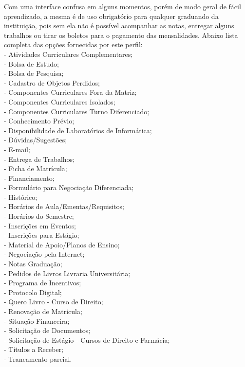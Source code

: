 Com uma interface confusa em alguns momentos, porém de modo geral de fácil aprendizado, 
a mesma é de uso obrigatório para qualquer graduando da instituição, pois sem ela não é possível 
acompanhar as notas, entregar alguns trabalhos ou tirar os boletos para o pagamento das mensalidades. 
Abaixo lista completa das opções fornecidas por este perfil: \\
- Atividades Curriculares Complementares; \\
- Bolsa de Estudo; \\
- Bolsa de Pesquisa; \\
- Cadastro de Objetos Perdidos; \\
- Componentes Curriculares Fora da Matriz; \\
- Componentes Curriculares Isolados; \\
- Componentes Curriculares Turno Diferenciado; \\
- Conhecimento Prévio; \\
- Disponibilidade de Laboratórios de Informática; \\
- Dúvidas/Sugestões; \\
- E-mail; \\
- Entrega de Trabalhos; \\
- Ficha de Matrícula; \\
- Financiamento; \\
- Formulário para Negociação Diferenciada; \\
- Histórico; \\
- Horários de Aula/Ementas/Requisitos; \\
- Horários do Semestre; \\
- Inscrições em Eventos; \\
- Inscrições para Estágio; \\
- Material de Apoio/Planos de Ensino; \\
- Negociação pela Internet; \\
- Notas Graduação; \\
- Pedidos de Livros Livraria Universitária; \\
- Programa de Incentivos; \\
- Protocolo Digital; \\
- Quero Livro - Curso de Direito; \\
- Renovação de Matricula; \\
- Situação Financeira; \\
- Solicitação de Documentos; \\
- Solicitação de Estágio - Cursos de Direito e Farmácia; \\
- Titulos a Receber; \\
- Trancamento parcial. \\

